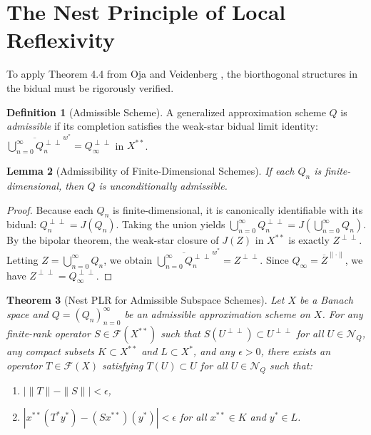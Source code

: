 \documentclass[11pt,reqno]{amsart}
\newtheorem{theorem}{Theorem}[section]
\newtheorem{lemma}[theorem]{Lemma}
\theoremstyle{definition}
\newtheorem{definition}[theorem]{Definition}
\begin{document}
\section{The Nest Principle of Local Reflexivity}

To apply Theorem 4.4 from Oja and Veidenberg \cite{OV2017}, the biorthogonal structures in the bidual must be rigorously verified. 

\begin{definition}[Admissible Scheme] \label{def:admissible}
A generalized approximation scheme $Q$ is \textit{admissible} if its completion satisfies the weak-star bidual limit identity: $\overline{\bigcup_{n=0}^\infty Q_n^{\perp\perp}}^{w^*} = Q_\infty^{\perp\perp}$ in $X^{**}$.
\end{definition}

\begin{lemma}[Admissibility of Finite-Dimensional Schemes] \label{lem:finite_dim_admissible}
If each $Q_n$ is finite-dimensional, then $Q$ is unconditionally admissible.
\end{lemma}

\begin{proof}
Because each $Q_n$ is finite-dimensional, it is canonically identifiable with its bidual: $Q_n^{\perp\perp} = J(Q_n)$. Taking the union yields $\bigcup_{n=0}^\infty Q_n^{\perp\perp} = J\left(\bigcup_{n=0}^\infty Q_n\right)$. By the bipolar theorem, the weak-star closure of $J(Z)$ in $X^{**}$ is exactly $Z^{\perp\perp}$. Letting $Z = \bigcup_{n=0}^\infty Q_n$, we obtain $\overline{\bigcup_{n=0}^\infty Q_n^{\perp\perp}}^{w^*} = Z^{\perp\perp}$. Since $Q_\infty = \overline{Z}^{\|\cdot\|}$, we have $Z^{\perp\perp} = Q_\infty^{\perp\perp}$.
\end{proof}

\begin{theorem}[Nest PLR for Admissible Subspace Schemes] \label{thm:nest_plr}
Let $X$ be a Banach space and $Q = (Q_n)_{n=0}^\infty$ be an \textit{admissible} approximation scheme on $X$. For any finite-rank operator $S \in \mathcal{F}(X^{**})$ such that $S(U^{\perp\perp}) \subset U^{\perp\perp}$ for all $U \in \mathcal{N}_Q$, any compact subsets $K \subset X^{**}$ and $L \subset X^*$, and any $\epsilon > 0$, there exists an operator $T \in \mathcal{F}(X)$ satisfying $T(U) \subset U$ for all $U \in \mathcal{N}_Q$ such that:
\begin{enumerate}
    \item $|\|T\| - \|S\|| < \epsilon$,
    \item $|x^{**}(T^* y^*) - (S x^{**})(y^*)| < \epsilon$ for all $x^{**} \in K$ and $y^* \in L$.
\end{enumerate}
\end{theorem}
\end{document}
